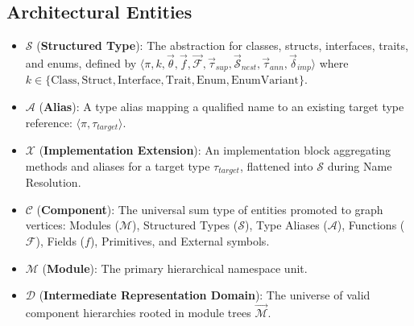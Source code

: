 \subsection{Architectural Entities}
\begin{itemize}
  \item $\mathcal{S}$ (\textbf{Structured Type}): The abstraction for classes,
    structs, interfaces, traits, and enums, defined by
    $\langle \pi, k, \vec{\theta}, \vec{f}, \vec{\mathcal{F}},
    \vec{\tau}_{sup}, \vec{\mathcal{S}}_{nest}, \vec{\tau}_{ann},
    \vec{\delta}_{imp} \rangle$
    where $k \in \{ \text{Class}, \text{Struct}, \text{Interface},
    \text{Trait}, \text{Enum}, \text{EnumVariant} \}$.
  \item $\mathcal{A}$ (\textbf{Alias}): A type alias mapping a qualified
    name to an existing target type reference: $\langle \pi,
    \tau_{target} \rangle$.
  \item $\mathcal{X}$ (\textbf{Implementation Extension}): An
    implementation block
    aggregating methods and aliases for a target type $\tau_{target}$, flattened
    into $\mathcal{S}$ during Name Resolution.
  \item $\mathcal{C}$ (\textbf{Component}): The universal sum type of entities
    promoted to graph vertices: Modules ($\mathcal{M}$), Structured Types
    ($\mathcal{S}$), Type Aliases ($\mathcal{A}$), Functions ($\mathcal{F}$),
    Fields ($f$), Primitives, and External symbols.
  \item $\mathcal{M}$ (\textbf{Module}): The primary hierarchical
    namespace unit.
  \item $\mathcal{D}$ (\textbf{Intermediate Representation Domain}):
    The universe
    of valid component hierarchies rooted in module trees $\vec{\mathcal{M}}$.
\end{itemize}

